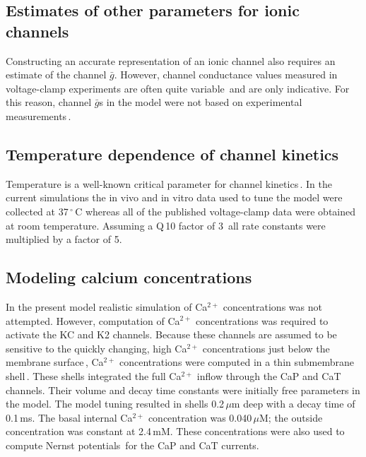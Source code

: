 \documentclass[12pt]{article}
\begin{document}
\subsection*{Estimates of other parameters for ionic channels}

Constructing an accurate
representation of an ionic channel also requires an estimate of
the channel $\bar g$. However, channel conductance values measured in
voltage-clamp experiments are often quite variable\,\cite{McCormick:1992fk} and are only indicative. For this reason,
channel $\bar g$s in the model were not based on experimental measurements\,\cite{S:1993dz, De-Schutter-E:1993fu}.

\subsection*{Temperature dependence of channel kinetics}

Temperature is a well-known critical parameter for channel kinetics\,\cite{Hille:1991zr}.
In the current simulations the in vivo and in vitro data
used to tune the model were collected at 37\,$^\circ$\,C whereas all of the
published voltage-clamp data were obtained at room temperature.
Assuming a Q\,10 factor of 3\,\cite{L:1952fv} all rate constants were multiplied by a factor of 5.

\subsection*{Modeling calcium concentrations}

In the present model realistic simulation of Ca$^{2+}$ concentrations was not attempted. However, computation of Ca$^{2+}$ concentrations was required to activate the
KC and K2 channels. Because these channels are assumed to be
sensitive to the quickly changing, high Ca$^{2+}$ concentrations just
below the membrane surface\,\cite{L:1989ff}, Ca$^{2+}$ concentrations were 
computed in a thin submembrane shell\,\cite{D:1982lh}. These shells integrated the full Ca$^{2+}$ inflow through
the CaP and CaT channels. Their volume and decay time constants
were initially free parameters in the model. The model tuning
resulted in shells 0.2\,$\mu$m deep with a decay time of 0.1\,ms.
The basal internal Ca$^{2+}$ concentration was 0.040\,$\mu$M; the outside
concentration was constant at 2.4\,mM. These concentrations
were also used to compute Nernst potentials\,\cite{Hille:1991zr} for the
CaP and CaT currents.



\end{document}
